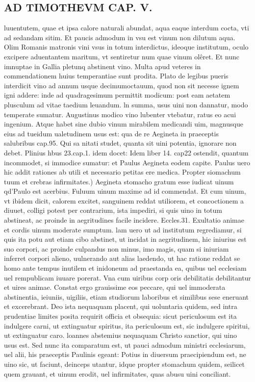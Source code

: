 \documentclass{article}
\begin{document}
\begin{pages}
\section*{AD TIMOTHEVM CAP. V. }
\marginpar{[ p.117 ]}\pstart luuentutem, quae et ipsa calore naturali abundat, aqua eaque interdum cocta, vti ad sedandam sitim. Et paucis admodum in vsu est vinum non dilutum aqua. Olim Romanis matronis vini vsus in totum interdictus, ideoque institutum, oculo excipere aduentantem maritum, vt sentiretur num quae vinum olêret. Et nunc imnuptae in Gallia pletunq abstinent vino. Multa apud veteres in commendationem huius temperantiae sunt prodita. Plato de legibus pueris interdicit vino ad annum usque decimumoctauum, quod non sit necesse ignem igni addere: inde ad quadragesimum permittit modicum: post eam aetatem plusculum ad vitae taedium leuandum. ln summa, usus uini non dannatur, modo temperate sumatur. Augustinus modico vino lubenter vtebatur, ratus eo acui ingenium. Atque habet sine dubio vinum mirabilem medicandi uim, magnusque eius ad tueidum ualetudinem usus est: qua de re Aegineta in praeceptis salubribus cap.95. Qui sa nitati studet, quanta sit uini potentia, ignorare non debet. Plinius hbus 23.cap.1. idem docet: Idem liber 14. cap22 ostendit, quantum incommodet, si immodice sumatur: et Paulus Aegineta eodem capite. Paulus uero hic addit rationes ab utili et necessario petitas ere medica. Propter siomachum tuum et crebras infirmitates.) Aegineta stomacho gratum esse iudicat uinum qd'Paulo est acerbius. Fuluum uinum maxime ad id commendat. Et cum uinum, vt ibidem dicit, calorem excitet, sanguinem reddat utiliorem, et concoctionem a diuuet, colligi potest per contrarium, ista impediri, si quis uino in totum abstineat, ac proinde in aegritudines facile incidere. Eccles.31. Exultatio animae et cordis uinum moderate sumptum. lam uero ut ad institutum regrediamur, si quis ita potu aut etiam cibo abstinet, ut incidat in aegritudinem, hic iniurius est suo corpori, ac proinde culpandus non minus, imo magis, quam si iniuriam inferret corpori alieno, uulnerando aut alias laedendo, ut hac ratione reddat se homo ante tempus inutilem et inidoneum ad praestanda ea, quibus uel ecclesiam uel rempublicam iuuare porerat. Vna cum uiribus corp oris debilitatis debilitantur et uires animae. Constat ergo grauissime eos peccare, qui uel immoderata abstinentia, ieiuniis, uigiliis, etiam studiorum laboribus et similibus sese eneruant et excerebrant. Deo ista nequaquam placent, qui uoluntaria quidem, sed intra prudentiae limites posita requirit officia et obsequia: sicut periculosum est ita indulgere carni, ut extinguatur spiritus, ita periculosum est, sic indulgere spiritui, ut extinguatur caro. loannes abstemius nequaquam Christo sanctior, qui uino usus est. Sed nunc ita comparatum est, ut pauci admodum ministri ecclesiarum, uel alii, his praeceptis Paulinis egeant: Potius in diuersum praecipiendum est, ne uino sic, ut faciunt, deinceps utantur, idque propter stomachum quidem, seilicet quem grauant, et uinum erodit, uel infirmitates, quas abusu uini conciliant.  \pend
{}
{}

\end{pages}
\end{document}
